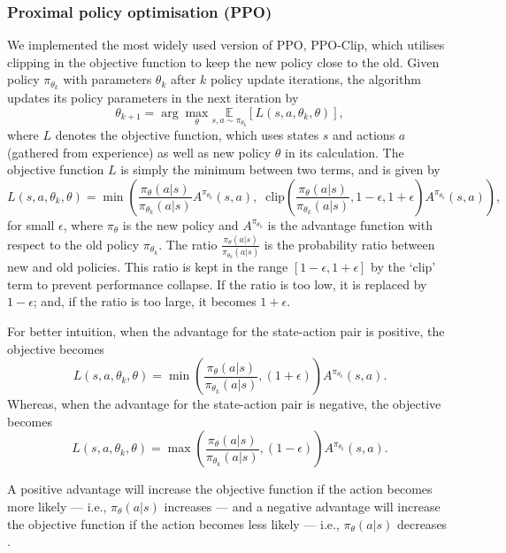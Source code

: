 \documentclass[12pt,a4paper]{article}
\begin{document}

\subsubsection{Proximal policy optimisation (PPO)}
We implemented the most widely used version of PPO, PPO-Clip, which utilises clipping in the objective function to keep the new policy close to the old. Given policy $\pi_{\theta_{k}}$ with parameters $\theta_k$ after $k$ policy update iterations, the algorithm updates its policy parameters in the next iteration by \[\theta_{k+1} = \arg \max_{\theta} \underset{s,a \sim \pi_{\theta_k}}{\mathbb{E}}\left[L(s,a,\theta_k, \theta)\right],\] where $L$ denotes the objective function, which uses states $s$ and actions $a$ (gathered from experience) as well as new policy $\theta$ in its calculation. The objective function $L$ is simply the minimum between two terms, and is given by \[L(s,a,\theta_k,\theta) = \min\left(\frac{\pi_{\theta}(a|s)}{\pi_{\theta_k}(a|s)}  A^{\pi_{\theta_k}}(s,a), \;\;\text{clip}\left(\frac{\pi_{\theta}(a|s)}{\pi_{\theta_k}(a|s)}, 1 - \epsilon, 1+\epsilon \right) A^{\pi_{\theta_k}}(s,a) \right),\] for small $\epsilon$, where $\pi_{\theta}$ is the new policy and $A^{\pi_{\theta_k}}$ is the advantage function with respect to the old policy $\pi_{\theta_{k}}$. The ratio $\frac{\pi_{\theta}(a|s)}{\pi_{\theta_k}(a|s)}$ is the probability ratio between new and old policies. This ratio is kept in the range $\left[1 - \epsilon, 1 + \epsilon \right]$ by the `clip' term to prevent performance collapse. If the ratio is too low, it is replaced by $1 - \epsilon$; and, if the ratio is too large, it becomes $1 + \epsilon$. 

For better intuition, when the advantage for the state-action pair is positive, the objective becomes \[L(s,a,\theta_k,\theta) = \min\left(\frac{\pi_{\theta}(a|s)}{\pi_{\theta_k}(a|s)}, (1 + \epsilon) \right)  A^{\pi_{\theta_k}}(s,a).\] Whereas, when the advantage for the state-action pair is negative, the objective becomes \[L(s,a,\theta_k,\theta) = \max\left(\frac{\pi_{\theta}(a|s)}{\pi_{\theta_k}(a|s)}, (1 - \epsilon) \right)  A^{\pi_{\theta_k}}(s,a).\]

A positive advantage will increase the objective function if the action becomes more likely --- i.e., \(\pi_{\theta}(a|s)\) increases --- and a negative advantage will increase the objective function if the action becomes less likely --- i.e., \(\pi_{\theta}(a|s)\) decreases \cite{SpinningUp2018}. 
\end{document}
